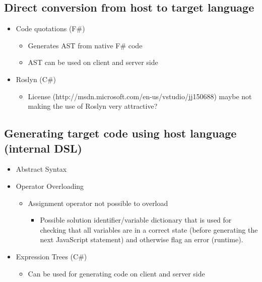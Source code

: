 	\subsection{Direct conversion from host to target language}
		\begin{itemize}
			\item Code quotations (F\#)
				\begin{itemize}
					\item Generates AST from native F\# code
					\item AST can be used on client and server side
				\end{itemize}
			\item Roslyn (C\#)
				\begin{itemize}
					\item License (http://msdn.microsoft.com/en-us/vstudio/jj150688) maybe not making the use of Roslyn very attractive?
				\end{itemize}
		\end{itemize}



	\subsection{Generating target code using host language (internal DSL)}
		\begin{itemize}
			\item Abstract Syntax
			\item Operator Overloading
				\begin{itemize}
					\item Assignment operator not possible to overload
						\begin{itemize}
							\item Possible solution identifier/variable dictionary that is used for checking that all variables are in a correct state (before generating the next JavaScript statement) and otherwise flag an error (runtime).
						\end{itemize}
				\end{itemize}
			\item Expression Trees (C\#)
				\begin{itemize}
					\item Can be used for generating code on client and server side
				\end{itemize}
		\end{itemize}